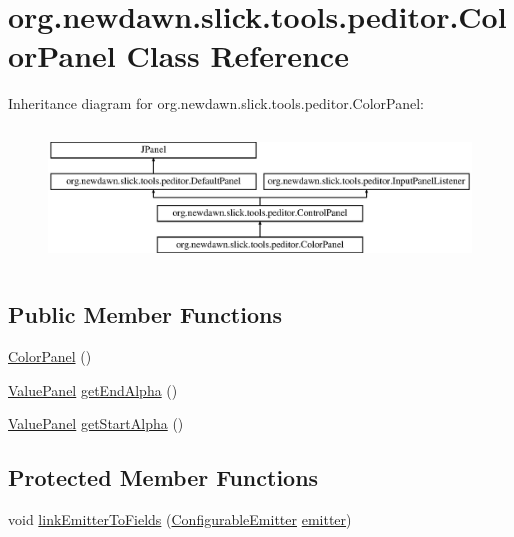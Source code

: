 \hypertarget{classorg_1_1newdawn_1_1slick_1_1tools_1_1peditor_1_1_color_panel}{}\section{org.\+newdawn.\+slick.\+tools.\+peditor.\+Color\+Panel Class Reference}
\label{classorg_1_1newdawn_1_1slick_1_1tools_1_1peditor_1_1_color_panel}
Inheritance diagram for org.\+newdawn.\+slick.\+tools.\+peditor.\+Color\+Panel\+:\begin{figure}[H]
\begin{center}
\leavevmode
\includegraphics[height=3.660131cm]{classorg_1_1newdawn_1_1slick_1_1tools_1_1peditor_1_1_color_panel}
\end{center}
\end{figure}
\subsection*{Public Member Functions}
\begin{DoxyCompactItemize}
\item 
\mbox{\hyperlink{classorg_1_1newdawn_1_1slick_1_1tools_1_1peditor_1_1_color_panel_a6b93e7ef840734bb2af57e4afd0a2612}{Color\+Panel}} ()
\item 
\mbox{\hyperlink{classorg_1_1newdawn_1_1slick_1_1tools_1_1peditor_1_1_value_panel}{Value\+Panel}} \mbox{\hyperlink{classorg_1_1newdawn_1_1slick_1_1tools_1_1peditor_1_1_color_panel_a98d17b9376493d11742c2365b25d8114}{get\+End\+Alpha}} ()
\item 
\mbox{\hyperlink{classorg_1_1newdawn_1_1slick_1_1tools_1_1peditor_1_1_value_panel}{Value\+Panel}} \mbox{\hyperlink{classorg_1_1newdawn_1_1slick_1_1tools_1_1peditor_1_1_color_panel_a00811a42b2046f100e075de7313cfb8b}{get\+Start\+Alpha}} ()
\end{DoxyCompactItemize}
\subsection*{Protected Member Functions}
\begin{DoxyCompactItemize}
\item 
void \mbox{\hyperlink{classorg_1_1newdawn_1_1slick_1_1tools_1_1peditor_1_1_color_panel_a6f2468161ab61b6d6387dfe9b893cd4c}{link\+Emitter\+To\+Fields}} (\mbox{\hyperlink{classorg_1_1newdawn_1_1slick_1_1particles_1_1_configurable_emitter}{Configurable\+Emitter}} \mbox{\hyperlink{classorg_1_1newdawn_1_1slick_1_1tools_1_1peditor_1_1_control_panel_aaa170169fa574cb6b271f782afcd2517}{emitter}})
\end{DoxyCompactItemize}
